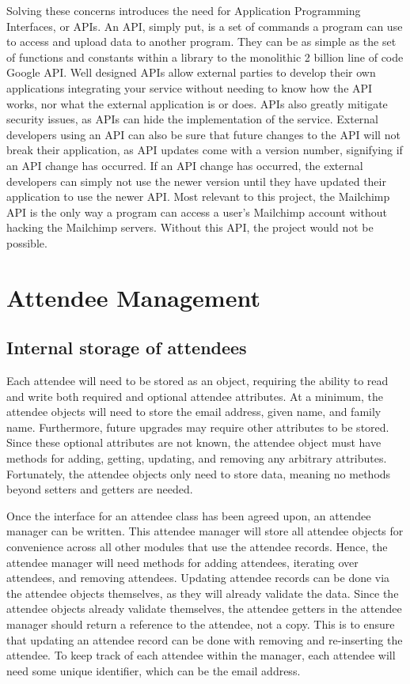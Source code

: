 \documentclass[11pt]{article}
\begin{document}
Solving these concerns introduces the need for Application Programming Interfaces, or APIs. An API, simply put, is a set of commands a program can use to access and upload data to another program. They can be as simple as the set of functions and constants within a library to the monolithic 2 billion line of code Google API. Well designed APIs allow external parties to develop their own applications integrating your service without needing to know how the API works, nor what the external application is or does. APIs also greatly mitigate security issues, as APIs can hide the implementation of the service. External developers using an API can also be sure that future changes to the API will not break their application, as API updates come with a version number, signifying if an API change has occurred. If an API change has occurred, the external developers can simply not use the newer version until they have updated their application to use the newer API. Most relevant to this project, the Mailchimp API is the only way a program can access a user's Mailchimp account without hacking the Mailchimp servers. Without this API, the project would not be possible.

\newpage

\section{Attendee Management}

\subsection{Internal storage of attendees}

Each attendee will need to be stored as an object, requiring the ability to read and write both required and optional attendee attributes. At a minimum, the attendee objects will need to store the email address, given name, and family name. Furthermore, future upgrades may require other attributes to be stored. Since these optional attributes are not known, the attendee object must have methods for adding, getting, updating, and removing any arbitrary attributes. Fortunately, the attendee objects only need to store data, meaning no methods beyond setters and getters are needed.

Once the interface for an attendee class has been agreed upon, an attendee manager can be written. This attendee manager will store all attendee objects for convenience across all other modules that use the attendee records. Hence, the attendee manager will need methods for adding attendees, iterating over attendees, and removing attendees. Updating attendee records can be done via the attendee objects themselves, as they will already validate the data. Since the attendee objects already validate themselves, the attendee getters in the attendee manager should return a reference to the attendee, not a copy. This is to ensure that updating an attendee record can be done with removing and re-inserting the attendee. To keep track of each attendee within the manager, each attendee will need some unique identifier, which can be the email address.
\end{document}
